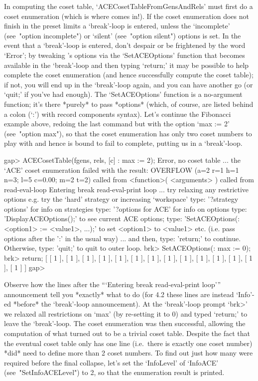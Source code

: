 In computing  the  coset  table,  `ACECosetTableFromGensAndRels'  must
first do a coset enumeration (which is where {\ACE} comes in!). If the
coset enumeration does not finish in the preset limits a  `break'-loop
is entered,  unless  the  `incomplete'  (see~"option  incomplete")  or
`silent' (see~"option silent") options is set. In  the  event  that  a
`break'-loop is entered, don't despair or be frightened  by  the  word
`Error'; by tweaking {\ACE}'s options via the `SetACEOptions' function
that becomes available in the `break'-loop and then  typing  `return;'
it may be possible to help {\ACE} complete the coset enumeration  (and
hence successfully compute the coset table); if not, you will  end  up
in the `break'-loop again, and you can have another go (or `quit;'  if
you've had enough). The  `SetACEOptions'  function  is  a  no-argument
function; it's there *purely* to pass *options* (which, of course, are
listed behind a colon (`:')  with  record  components  syntax).  Let's
continue the Fibonacci example above, redoing  the  last  command  but
with the option `max := 2'  (see~"option  max"),  so  that  the  coset
enumeration has only two coset numbers to play with and hence is bound
to fail to complete, putting us in a `break'-loop.

\beginexample
gap> ACECosetTable(fgens, rels, [c] : max := 2);  
Error, no coset table ...
 the `ACE' coset enumeration failed with the result:
 OVERFLOW (a=2 r=1 h=1 n=3; l=5 c=0.00; m=2 t=2)
 called from
<function>( <arguments> ) called from read-eval-loop
Entering break read-eval-print loop ...
 try relaxing any restrictive options
 e.g. try the `hard' strategy or increasing `workspace'
 type: '?strategy options' for info on strategies
 type: '?options for ACE' for info on options
 type: 'DisplayACEOptions();' to see current ACE options;
 type: 'SetACEOptions(:<option1> := <value1>, ...);'
 to set <option1> to <value1> etc.
 (i.e. pass options after the ':' in the usual way)
 ... and then, type: 'return;' to continue.
 Otherwise, type: 'quit;' to quit to outer loop.
brk> SetACEOptions(: max := 0);
brk> return;
[ [ 1 ], [ 1 ], [ 1 ], [ 1 ], [ 1 ], [ 1 ], [ 1 ], [ 1 ], [ 1 ], [ 1 ], 
  [ 1 ], [ 1 ], [ 1 ], [ 1 ] ]
gap> 
\endexample

Observe how the lines  after  the  ```Entering  break  read-eval-print
loop''' announcement tell you *exactly* what to  do  (for  {\GAP}  4.2
these  lines  are  instead   `Info'-ed   *before*   the   `break'-loop
announcement). At  the  `break'-loop  prompt  `brk>'  we  relaxed  all
restrictions on `max' (by re-setting it to 0) and typed  `return;'  to
leave the `break'-loop. The coset  enumeration  was  then  successful,
allowing the computation of what turned out  to  be  a  trivial  coset
table. Despite the fact that the eventual coset  table  only  has  one
line (i.e.~there is exactly one coset number)  {\ACE}  *did*  need  to
define more than 2 coset numbers. To  find  out  just  how  many  were
required before the final  collapse,  let's  set  the  `InfoLevel'  of
`InfoACE' (see~"SetInfoACELevel") to 2, so that the {\ACE} enumeration
result is printed.

